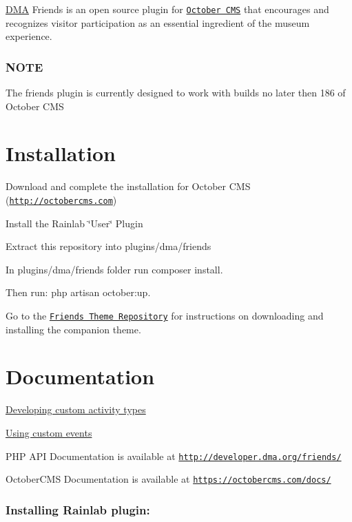 \hyperlink{namespaceDMA}{D\+M\+A} Friends is an open source plugin for \href{http://octobercms.com}{\tt October C\+M\+S} that encourages and recognizes visitor participation as an essential ingredient of the museum experience.

\subsubsection*{N\+O\+T\+E}

The friends plugin is currently designed to work with builds no later then 186 of October C\+M\+S

\section*{Installation}


\begin{DoxyItemize}
\item Download and complete the installation for October C\+M\+S (\href{http://octobercms.com}{\tt http\+://octobercms.\+com})
\item Install the Rainlab \char`\"{}\+User\char`\"{} Plugin
\item Extract this repository into plugins/dma/friends
\item In plugins/dma/friends folder run {\ttfamily composer install}.
\item Then run\+: {\ttfamily php artisan october\+:up}.
\item Go to the \href{https://github.com/DallasMuseumArt/OctoberFriendsTheme}{\tt Friends Theme Repository} for instructions on downloading and installing the companion theme.
\end{DoxyItemize}

\section*{Documentation}

\hyperlink{md_docs_ACTIVITY-TYPES}{Developing custom activity types}

\hyperlink{md_docs_EVENTS}{Using custom events}

P\+H\+P A\+P\+I Documentation is available at \href{http://developer.dma.org/friends/}{\tt http\+://developer.\+dma.\+org/friends/}

October\+C\+M\+S Documentation is available at \href{https://octobercms.com/docs/}{\tt https\+://octobercms.\+com/docs/}

\subsubsection*{Installing Rainlab plugin\+:}

